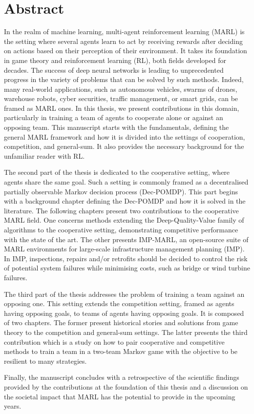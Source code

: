 
\chapter*{Abstract}

In the realm of machine learning, multi-agent reinforcement learning (MARL) is the setting where several agents learn to act by receiving rewards after deciding on actions based on their perception of their environment.
It takes its foundation in game theory and reinforcement learning (RL), both fields developed for decades.
The success of deep neural networks is leading to unprecedented progress in the variety of problems that can be solved by such methods.
Indeed, many real-world applications, such as autonomous vehicles, swarms of drones, warehouse robots, cyber securities, traffic management, or smart grids, can be framed as MARL ones.
In this thesis, we present contributions in this domain, particularly in training a team of agents to cooperate alone or against an opposing team.
This manuscript starts with the fundamentals, defining the general MARL framework and how it is divided into the settings of cooperation, competition, and general-sum.
It also provides the necessary background for the unfamiliar reader with RL.

The second part of the thesis is dedicated to the cooperative setting, where agents share the same goal.
Such a setting is commonly framed as a decentralised partially observable Markov decision process (Dec-POMDP).
This part begins with a background chapter defining the Dec-POMDP and how it is solved in the literature.
The following chapters present two contributions to the cooperative MARL field.
One concerns methods extending the Deep-Quality-Value family of algorithms to the cooperative setting, demonstrating competitive performance with the state of the art.
The other presents IMP-MARL, an open-source suite of MARL environments for large-scale infrastructure management planning (IMP).
In IMP, inspections, repairs and/or retrofits should be decided to control the risk of potential system failures while minimising costs, such as bridge or wind turbine failures.

The third part of the thesis addresses the problem of training a team against an opposing one.
This setting extends the competition setting, framed as agents having opposing goals, to teams of agents having opposing goals.
It is composed of two chapters.
The former present historical stories and solutions from game theory to the competition and general-sum settings.
The latter presents the third contribution which is a study on how to pair cooperative and competitive methods to train a team in a two-team Markov game with the objective to be resilient to many strategies.

Finally, the manuscript concludes with a retrospective of the scientific findings provided by the contributions at the foundation of this thesis and a discussion on the societal impact that MARL has the potential to provide in the upcoming years.

